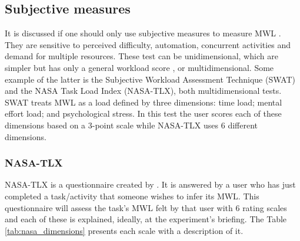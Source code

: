     \subsection{Subjective measures}
    \label{subsec:subjective_measures}    

        It is discussed if one should only use subjective measures to measure MWL \cite{sanders1998human, stanton2004handbook}. They are sensitive to perceived difficulty, automation, concurrent activities and demand for multiple resources. These test can be unidimensional, which are simpler but has only a general workload score \cite{stanton2004handbook}, or multidimensional. Some example of the latter is the Subjective Workload Assessment Technique (SWAT) and the NASA Task Load Index (NASA-TLX), both multidimensional tests. SWAT treats MWL as a load defined by three dimensions: time load; mental effort load; and psychological stress. In this test the user scores each of these dimensions based on a 3-point scale while NASA-TLX uses 6 different dimensions.
        
        \subsubsection{NASA-TLX}
        \label{subsec:nasa_tlx}
        
            NASA-TLX is a questionnaire created by . It is answered by a user who has just completed a task/activity that someone wishes to infer its MWL. This questionnaire will assess the task's MWL felt by that user with 6 rating scales and each of these is explained, ideally, at the experiment's briefing. The Table \ref{tab:nasa_dimensions} presents each scale with a description of it.
        
